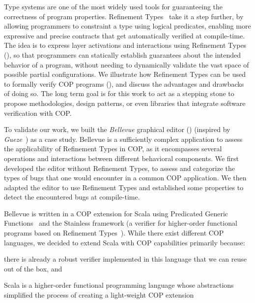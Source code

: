 Type systems are one of the most widely used tools for guaranteeing the correctness of program 
properties. Refinement Types~\cite{jhala21} take it a step further, by allowing programmers to constraint 
a type using logical predicates, enabling more expressive and precise contracts that get automatically 
verified at compile-time. The idea is to express layer activations and interactions using 
Refinement Types (), so that programmers can statically establish guarantees 
about the intended behavior of a program, without needing to dynamically validate the vast space of 
possible partial configurations. We illustrate how Refinement Types can be used to formally verify 
\ac{COP} programs (), and discuss the advantages and drawbacks of doing 
so. The long term goal is for this work to act as a stepping stone to propose methodologies, design 
patterns, or even libraries that integrate software verification with \ac{COP}.

To validate our work, we built the \emph{Bellevue} graphical editor () (inspired by 
\emph{Gueze}~\cite{vallejos10pred}) as a case study. Bellevue is a sufficiently complex application to 
assess the applicability of Refinement Types in \ac{COP}, as it encompasses several operations and 
interactions between different behavioral components. We first developed the editor without Refinement 
Types, to assess and categorize the types of bugs that one would encounter in a common \ac{COP} 
application. We then adapted the editor to use Refinement Types and established some properties to 
detect the encountered bugs at compile-time.

Bellevue is written in a \ac{COP} extension for Scala using Predicated Generic 
Functions~\cite{vallejos10pred} and the Stainless framework (a verifier for higher-order functional 
programs based on Refinement Types~\cite{hamza19}). While there exist different \ac{COP} languages, 
we decided to extend Scala with \ac{COP} capabilities primarily because:
\begin{enumerate*}[label=(\arabic*)]
  \item there is already a robust verifier implemented in this language that we can reuse out of the box,
  and
  \item Scala is a higher-order functional programming language whose abstractions simplified the 
  process of creating a light-weight \ac{COP} extension
\end{enumerate*}

